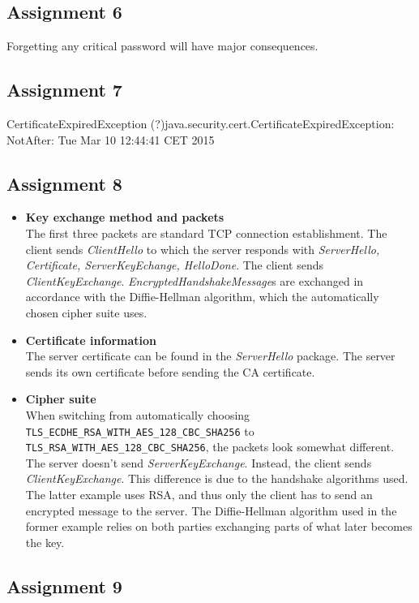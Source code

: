 \documentclass[11pt,a4paper]{article}
\begin{document}
\subsection{Assignment 6}
Forgetting any critical password will have major consequences.
\subsection{Assignment 7}
CertificateExpiredException (?)java.security.cert.CertificateExpiredException: NotAfter: Tue Mar 10 12:44:41 CET 2015
\subsection{Assignment 8} 
\begin{itemize}
\item \textbf{Key exchange method and packets}\\The first three packets are standard TCP connection establishment. The client sends \textit{ClientHello} to which the server responds with \textit{ServerHello, Certificate, ServerKeyEchange, HelloDone}. The client sends \textit{ClientKeyExchange}. \textit{EncryptedHandshakeMessage}s are exchanged in accordance with the Diffie-Hellman algorithm, which the automatically chosen cipher suite uses.
\item \textbf{Certificate information}\\
The server certificate can be found in the \textit{ServerHello} package. The server sends its own certificate before sending the CA certificate.
\item \textbf{Cipher suite}\\
When switching from automatically choosing \texttt{TLS\_ECDHE\_RSA\_WITH\_AES\_128\_CBC\_SHA256} to
\texttt{TLS\_RSA\_WITH\_AES\_128\_CBC\_SHA256}, the packets look somewhat different. The server doesn't send \textit{ServerKeyExchange}. Instead, the client sends \textit{ClientKeyExchange}. This difference is due to the handshake algorithms used. The latter example uses RSA, and thus only the client has to send an encrypted message to the server. The Diffie-Hellman algorithm used in the former example relies on both parties exchanging parts of what later becomes the key.
\end{itemize}

\subsection{Assignment 9}
\end{document}
